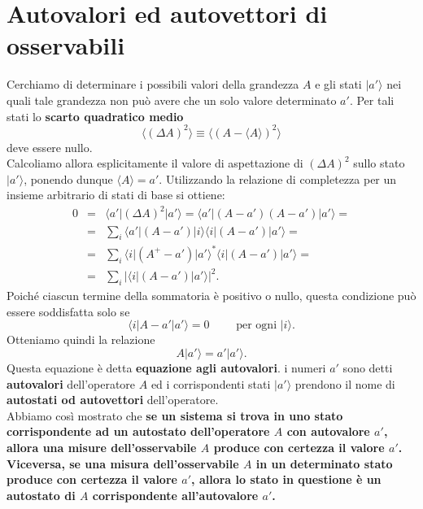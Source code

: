 \documentclass[a4paper,12pt,oneside]{book}
\begin{document}
\section{Autovalori ed autovettori di osservabili}
Cerchiamo di determinare i possibili valori della grandezza $A$ e gli stati $\vert a' \rangle$ nei quali tale grandezza non può avere che un solo valore determinato $a'$. Per tali stati lo \textbf{scarto quadratico medio} 
\begin{equation}
\langle \left( \Delta A \right) ^2 \rangle \equiv \langle \left( A- \langle A\rangle \right) ^2 \rangle
\end{equation}
deve essere nullo.\\
Calcoliamo allora esplicitamente il valore di aspettazione di $(\Delta A )^2$ sullo stato $\vert a' \rangle$, ponendo dunque $\langle A \rangle = a'$. Utilizzando la relazione di completezza per un insieme arbitrario di stati di base si ottiene:
\begin{eqnarray}
0 & = & \langle a' \vert (\Delta A )^2 \vert a'\rangle = \langle a' \vert (A-a' )(A-a') \vert a'\rangle= \nonumber \\
& = & \sum _i \langle a' \vert (A-a' ) \vert i \rangle \langle i \vert (A-a' ) \vert a' \rangle = \\
& = & \sum _i \langle i \vert (A^{+}-a' ) \vert a' \rangle ^* \langle i \vert (A-a' ) \vert a' \rangle = \nonumber \\
& = & \sum _i \vert \langle i \vert (A-a' ) \vert a' \rangle \vert ^2.\nonumber
\end{eqnarray}
Poiché ciascun termine della sommatoria è positivo o nullo, questa condizione può essere soddisfatta solo se
\begin{equation}
\langle i \vert A-a' \vert a' \rangle =0 \qquad \textrm{ per ogni } \vert i \rangle .
\end{equation}
Otteniamo quindi la relazione
\begin{equation}
A \vert a' \rangle =a' \vert a' \rangle .
\end{equation}
Questa equazione è detta \textbf{equazione agli autovalori}. i numeri $a'$ sono detti \textbf{autovalori} dell'operatore $A$ ed i corrispondenti stati $\vert a' \rangle $ prendono il nome di \textbf{autostati od autovettori} dell'operatore.\\
Abbiamo così mostrato che \textbf{se un sistema si trova in uno stato corrispondente ad un autostato dell'operatore $A$ con autovalore $a'$, allora una misure dell'osservabile $A$ produce con certezza il valore $a'$. Viceversa, se una misura dell'osservabile $A$ in un determinato stato produce con certezza il valore $a'$, allora lo stato in questione è un autostato di $A$ corrispondente all'autovalore $a'$.}\\
\end{document}
